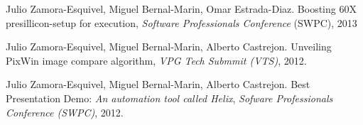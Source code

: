 
\begin{bibsection}
  \item Julio Zamora-Esquivel, Miguel Bernal-Marin, Omar Estrada-Diaz.
	Boosting 60X presillicon-setup for execution,
	\emph{Software Professionals Conference} (SWPC), 2013

  \item Julio Zamora-Esquivel, Miguel Bernal-Marin, Alberto Castrejon.
        Unveiling PixWin image compare algorithm,
        \emph{VPG Tech Submmit (VTS)}, 2012.

  \item Julio Zamora-Esquivel, Miguel Bernal-Marin, Alberto Castrejon.
        Best Presentation Demo: \emph{An automation tool called Helix},
        \emph{Sofware Professionals Conference (SWPC)}, 2012.
\end{bibsection}
